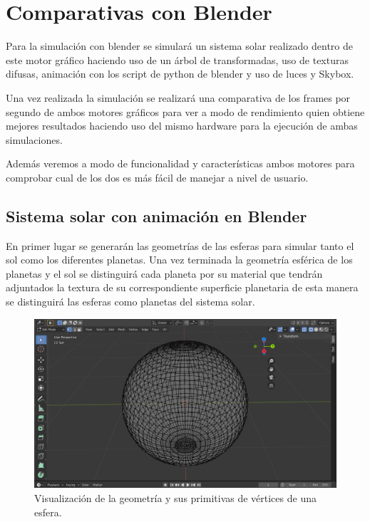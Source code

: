 \documentclass[a4paper, 17pt]{book}
\begin{document}
\section{Comparativas con Blender}
\label{sec:BlenderComp}

Para la simulación con blender se simulará un sistema solar realizado dentro de este motor gráfico haciendo uso de un árbol de transformadas,
uso de texturas difusas, animación con los script de python de blender y uso de luces y Skybox. 

\vspace{1mm} %

Una vez realizada la  simulación se realizará una comparativa de los frames por segundo de ambos motores gráficos para ver a modo de
rendimiento quien obtiene mejores resultados haciendo uso del mismo hardware para la ejecución de ambas simulaciones.

\vspace{1mm} %

Además veremos a modo de funcionalidad y características ambos motores para comprobar cual de los dos es más fácil de manejar a nivel
de usuario.

\subsection{Sistema solar con animación en Blender}
\label{subsec:BlenderComp}

En primer lugar se generarán las geometrías de las esferas para simular tanto el sol como los diferentes planetas. Una vez terminada
la geometría esférica de los planetas y el sol se distinguirá cada planeta por su material que tendrán adjuntados la textura de su
correspondiente superficie planetaria de esta manera se distinguirá las esferas como planetas del sistema solar. 

\begin{figure}[H]
    \centering
    \includegraphics[scale=0.25, keepaspectratio]{img/Geometry.png}
    \caption{Visualización de la geometría y sus primitivas de vértices de una esfera.}
    \label{figura:Geometry}
\end{figure}
\end{document}
